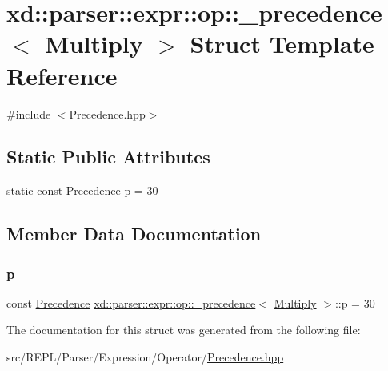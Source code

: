 \hypertarget{structxd_1_1parser_1_1expr_1_1op_1_1__precedence_3_01_multiply_01_4}{}\section{xd\+:\+:parser\+:\+:expr\+:\+:op\+:\+:\+\_\+precedence$<$ Multiply $>$ Struct Template Reference}
\label{structxd_1_1parser_1_1expr_1_1op_1_1__precedence_3_01_multiply_01_4}


{\ttfamily \#include $<$Precedence.\+hpp$>$}

\subsection*{Static Public Attributes}
\begin{DoxyCompactItemize}
\item 
static const \mbox{\hyperlink{namespacexd_1_1parser_1_1expr_1_1op_ae27abd4a02cd8125663cb2bacac299b2}{Precedence}} \mbox{\hyperlink{structxd_1_1parser_1_1expr_1_1op_1_1__precedence_3_01_multiply_01_4_a6b0f1c28cfbea2e4863956b600d922bb}{p}} = 30
\end{DoxyCompactItemize}


\subsection{Member Data Documentation}
\mbox{\label{structxd_1_1parser_1_1expr_1_1op_1_1__precedence_3_01_multiply_01_4_a6b0f1c28cfbea2e4863956b600d922bb}} 
\subsubsection{\texorpdfstring{p}{p}}
{\footnotesize\ttfamily const \mbox{\hyperlink{namespacexd_1_1parser_1_1expr_1_1op_ae27abd4a02cd8125663cb2bacac299b2}{Precedence}} \mbox{\hyperlink{structxd_1_1parser_1_1expr_1_1op_1_1__precedence}{xd\+::parser\+::expr\+::op\+::\+\_\+precedence}}$<$ \mbox{\hyperlink{structxd_1_1parser_1_1expr_1_1op_1_1_multiply}{Multiply}} $>$\+::p = 30\hspace{0.3cm}{\ttfamily [static]}}



The documentation for this struct was generated from the following file\+:\begin{DoxyCompactItemize}
\item 
src/\+R\+E\+P\+L/\+Parser/\+Expression/\+Operator/\mbox{\hyperlink{_precedence_8hpp}{Precedence.\+hpp}}\end{DoxyCompactItemize}
